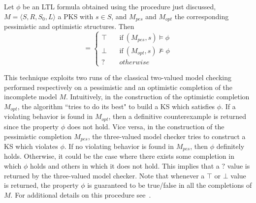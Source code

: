 \begin{theorem}
\label{th:threevaluedMC}
Let $\phi$ be an LTL formula obtained using the procedure just discussed, $M=\langle S, R, S_0, L\rangle $ a PKS with $s \in S$, and $M_{pes}$ and $M_{opt}$ the corresponding pessimistic and optimistic structures. Then
\begin{equation}
    [(M,s)\models\phi]  = 
                						 \begin{cases}
                  				 				\top & \quad \text{if}\ (M_{pes},s)\models\phi\\
                  								\bot & \quad \text{if}\ (M_{opt},s)\not\models\phi\\
                  								? & \quad  otherwise
                						\end{cases}
\end{equation}
\end{theorem}

This technique exploits two runs of the classical two-valued model checking performed respectively on a pessimistic and an optimistic completion of the incomplete model $M$.
Intuitively, in the construction of the optimistic completion $M_{opt}$, the algorithm ``tries to do its best" to build a KS which satisfies $\phi$. 
If a violating behavior is found in $M_{opt}$, then a definitive counterexample is returned since the property $\phi$ does not hold.
Vice versa, in the construction of the pessimistic completion $M_{pes}$, the three-valued model checker tries to construct a KS which violates $\phi$. 
If no violating behavior is found in $M_{pes}$, then $\phi$  definitely holds.
Otherwise, it could be the case where there exists some completion in which $\phi$ holds and others in which it does not hold. 
This implies that a $?$ value is returned by the three-valued model checker.
Note that whenever a $\top$ or $\bot$ value is returned, the property $\phi$ is guaranteed to be true/false in all the completions of $M$.
For additional details on this procedure see~\cite{bruns2000model,godefroid2011ltl}.






